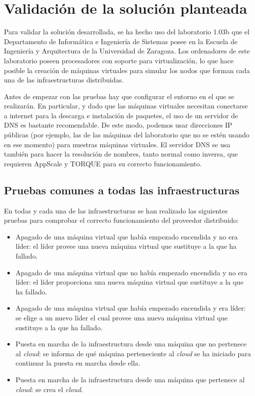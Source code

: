\chapter{Validación de la solución planteada}
\label{cap:validacion}


Para validar la solución desarrollada, se ha hecho uso del laboratorio 1.03b que el Departamento de Informática e Ingeniería de Sistemas posee en la Escuela de Ingeniería y Arquitectura de la Universidad de Zaragoza. Los ordenadores de este laboratorio poseen procesadores con soporte para virtualización, lo que hace posible la creación de máquinas virtuales para simular los nodos que forman cada una de las infraestructuras distribuidas.

Antes de empezar con las pruebas hay que configurar el entorno en el que se realizarán. En particular, y dado que las máquinas virtuales necesitan conectarse a internet para la descarga e instalación de paquetes, el uso de un servidor de DNS es bastante recomendable. De este modo, podemos usar direcciones IP públicas (por ejemplo, las de las máquinas del laboratorio que no se estén usando en ese momento) para nuestras máquinas virtuales. El servidor DNS se usa también para hacer la resolución de nombres, tanto normal como inversa, que requieren AppScale y TORQUE para su correcto funcionamiento.


\section{Pruebas comunes a todas las infraestructuras}

En todas y cada una de las infraestructuras se han realizado las siguientes pruebas para comprobar el correcto funcionamiento del proveedor distribuido:

\begin{itemize}
\item Apagado de una máquina virtual que había empezado encendida y no era líder: el líder provee una nueva máquina virtual que sustituye a la que ha fallado.
\item Apagado de una máquina virtual que no había empezado encendida y no era líder: el líder proporciona una nueva máquina virtual que sustituye a la que ha fallado.
\item Apagado de una máquina virtual que había empezado encendida y era líder: se elige a un nuevo líder el cual provee una nueva máquina virtual que sustituye a la que ha fallado.
\item Puesta en marcha de la infraestructura desde una máquina que no pertenece al \emph{cloud}: se informa de qué máquina perteneciente al \emph{cloud} se ha iniciado para continuar la puesta en marcha desde ella.
\item Puesta en marcha de la infraestructura desde una máquina que pertenece al \emph{cloud}: se crea el \emph{cloud}.
\end{itemize}

